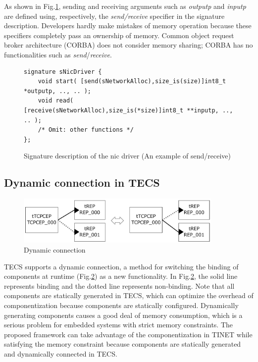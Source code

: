 \documentclass[a4j,12pt,oneside,openany,english]{jsbook}
\begin{document}
As shown in Fig.\ref{src:SendReceive}, sending and receiving arguments such as {\it outputp} and {\it inputp} are defined using, respectively, the {\it send/receive} specifier in the signature description.
Developers hardly make mistakes of memory operation because these specifiers completely pass an ownership of memory.
Common object request broker architecture (CORBA) does not consider memory sharing; CORBA has no functionalities
such as {\it send}/{\it receive}.

\begin{figure}[t]
\centering
\begin{lstlisting}
signature sNicDriver {
    void start( [send(sNetworkAlloc),size_is(size)]int8_t *outputp, .., .. );
    void read( [receive(sNetworkAlloc),size_is(*size)]int8_t **inputp, .., .. );
    /* Omit: other functions */
};
\end{lstlisting}
\caption{Signature description of the nic driver (An example of send/receive)}
\label{src:SendReceive}
\end{figure}

\subsection{Dynamic connection in TECS}
\label{sec:DynamicConnection}

\begin{figure}[t]
    \centering
    \includegraphics[width=10cm,clip]{figure/DynamicConnection.pdf}
    \caption{Dynamic connection}
    \label{fig:DynamicConnection}
\end{figure}

TECS supports a dynamic connection, a method for switching the binding of components at runtime (Fig.\ref{fig:DynamicConnection}) as a new functionality.
In Fig.\ref{fig:DynamicConnection}, the solid line represents binding and the dotted line represents non-binding.
Note that all components are statically generated in TECS, which can optimize the overhead of componentization because components are statically configured.
Dynamically generating components causes a good deal of memory consumption, which is a serious problem for embedded systems with strict memory constraints.
The proposed framework can take advantage of the componentization in TINET while satisfying the memory constraint because components are statically generated and dynamically connected in TECS.
\end{document}
